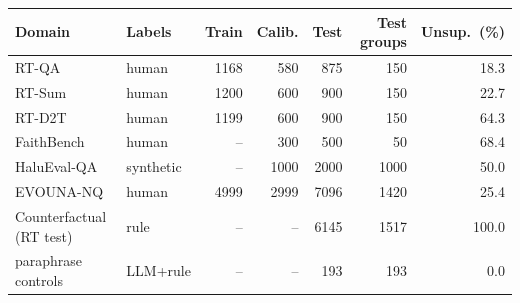 \begin{tabular}{llrrrrr}
\toprule
Domain & Labels & Train & Calib. & Test & Test groups & Unsup.\ (\%) \\
\midrule
RT-QA & human & 1168 & 580 & 875 & 150 & 18.3 \\
RT-Sum & human & 1200 & 600 & 900 & 150 & 22.7 \\
RT-D2T & human & 1199 & 600 & 900 & 150 & 64.3 \\
FaithBench & human & -- & 300 & 500 & 50 & 68.4 \\
HaluEval-QA & synthetic & -- & 1000 & 2000 & 1000 & 50.0 \\
\midrule
EVOUNA-NQ & human & 4999 & 2999 & 7096 & 1420 & 25.4 \\
\midrule
Counterfactual (RT test) & rule & -- & -- & 6145 & 1517 & 100.0 \\
\quad paraphrase controls & LLM+rule & -- & -- & 193 & 193 & 0.0 \\
\bottomrule
\end{tabular}
